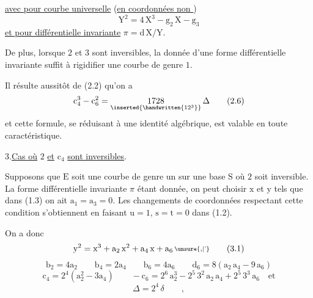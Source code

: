 \uline{avec pour courbe universelle} (\uline{en coordonnées non })
\[
\mathrm{Y}^{2}=4\,\mathrm{X}^{3}-\mathrm{g}_{2}\,\mathrm{X}-\mathrm{g}_{3}
\]
\uline{et pour différentielle invariante} $\pi=\mathrm{d}\,\mathrm{X}/\mathrm{Y}$.

De plus, lorsque $2$ et $3$ sont inversibles, la donnée d'une forme différentielle invariante suffit à rigidifier une courbe de genre $1$.

Il résulte aussitôt de (2.2) qu'on a
\[
\mathrm{c}_{4}^{3}-\mathrm{c}_{6}^{2}=\underset{\inserted{\handwritten{12^{3}}}}{1728}\,\Delta
\tag*{(2.6)}
\]
et cette formule, se réduisant à une identité algébrique, est valable en toute caractéristique.

3.\qquad \uline{Cas où} $2$ \uline{et} $\mathrm{c}_{4}$ \uline{sont inversibles}.

Supposons que $\mathrm{E}$ soit une courbe de genre un sur une base $\mathrm{S}$ où $2$ soit inversible. La forme différentielle invariante $\pi$ étant donnée, on peut choisir $\mathrm{x}$ et $\mathrm{y}$ tels que dans (1.3) on ait $\mathrm{a}_{1}=\mathrm{a}_{3}=0$. Les changements de coordonnées respectant cette condition s'obtiennent en faisant $\mathrm{u}=1$, $\mathrm{s}=\mathrm{t}=0$ dans (1.2).

On a donc
\[
\mathrm{y}^{2}=\mathrm{x}^{3}+\mathrm{a}_{2}\,\mathrm{x}^{2}+\mathrm{a}_{4}\,\mathrm{x}+\mathrm{a}_{6}\,\raisebox{.14ex}{\scriptsize\unsure{,|'}}
\tag*{(3.1)}
\]
\[
\mathrm{b}_{2}=4\mathrm{a}_{2}\qquad\mathrm{b}_{4}=2\mathrm{a}_{4}\qquad
\mathrm{b}_{6}=4\mathrm{a}_{6}\qquad\mathrm{d}_{6}=8(\mathrm{a}_{2}\,\mathrm{a}_{4}-9\,\mathrm{a}_{6})
\]
\[
\mathrm{c}_{4}=2^{4}(\mathrm{a}_{2}^{2}-3\mathrm{a}_{4})\qquad
-\mathrm{c}_{6}=2^{6}\,\mathrm{a}_{2}^{3}-2^{5}\,3^{2}\,\mathrm{a}_{2}\,\mathrm{a}_{4}+2^{5}\,3^{3}\,\mathrm{a}_{6}\quad\text{et}
\tag*{(3.2)}
\]
\[
\Delta=2^{4}\,\delta\qquad,
\]
\clearpage
